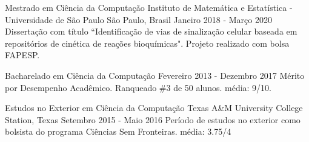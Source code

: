 \documentclass[11pt, a4paper]{awesome-cv-res}
\begin{document}
\makecvheader
\makecvfooter
{}
{}
{\thepage}



\begin{cventries}
\cventry
{Mestrado em Ciência da Computação}
{Instituto de Matemática e Estatística - Universidade de São Paulo} %
{São Paulo, Brasil} %
{Janeiro 2018 - Março 2020}
{Dissertação com título ``Identificação de vias de sinalização celular baseada em repositórios de cinética de reações bioquímicas". Projeto realizado com bolsa FAPESP.}
\newline

\cventry
{Bacharelado em Ciência da Computação} %
{} %
{} %
{Fevereiro 2013 - Dezembro 2017} %
{Mérito por Desempenho Acadêmico. Ranqueado \#3 de 50 alunos.\newline
média: 9/10.}
\newline

\cventry
{Estudos no Exterior em Ciência da Computação}
{Texas A\&M University}
{College Station, Texas}
{Setembro 2015 - Maio 2016}
{Período de estudos no exterior como bolsista do programa Ciências Sem Fronteiras. \newline média: 3.75/4}
\end{cventries}
\end{document}
